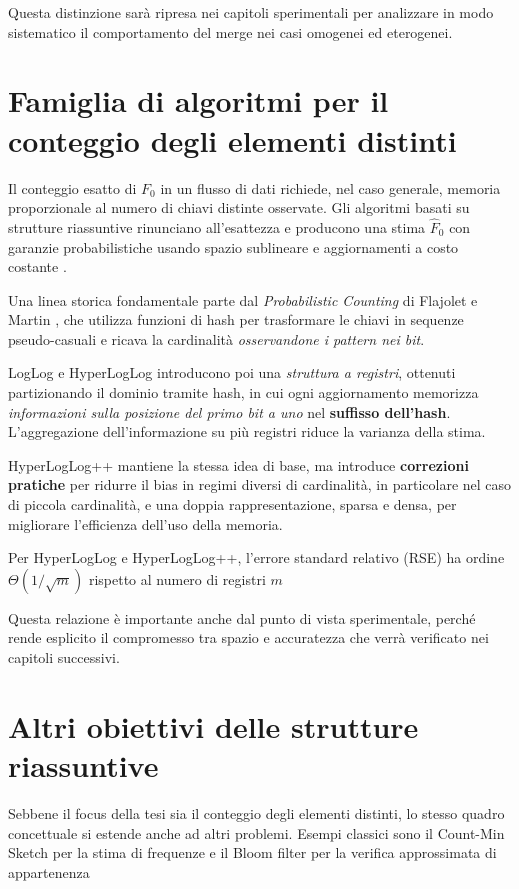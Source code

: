 Questa distinzione sarà ripresa nei capitoli sperimentali per analizzare in modo sistematico
il comportamento del merge nei casi omogenei ed eterogenei.

\section{Famiglia di algoritmi per il conteggio degli elementi distinti}
Il conteggio esatto di $F_0$ in un flusso di dati richiede, nel caso generale, memoria proporzionale
al numero di chiavi distinte osservate. Gli algoritmi basati su strutture riassuntive rinunciano all'esattezza
e producono una stima $\hat{F}_0$ con garanzie probabilistiche usando spazio sublineare
e aggiornamenti a costo costante \cite{BarYossef_Jayram_Kumar_Sivakumar_Trevisan_2002}.

Una linea storica fondamentale parte dal \emph{Probabilistic Counting} di Flajolet e Martin
\cite{Flajolet_Martin_1985}, che utilizza funzioni di hash per trasformare le chiavi
in sequenze pseudo-casuali e ricava la cardinalità \textit{osservandone i pattern nei bit}.

LogLog \cite{Durand_Flajolet_2003} e HyperLogLog \cite{Flajolet_Fusy_Gandouet_Meunier_2007}
introducono poi una \textit{struttura a registri}, ottenuti partizionando il dominio tramite hash,
in cui ogni aggiornamento memorizza \textit{informazioni sulla posizione del primo bit a uno} nel \textbf{suffisso dell'hash}.
L'aggregazione dell'informazione su più registri riduce la varianza della stima.

HyperLogLog++ \cite{Heule_Nunkesser_Hall_2013} mantiene la stessa idea di base,
ma introduce \textbf{correzioni pratiche} per ridurre il bias in regimi diversi di cardinalità,
in particolare nel caso di piccola cardinalità, e una doppia rappresentazione,
sparsa e densa, per migliorare l'efficienza dell'uso della memoria.

Per HyperLogLog e HyperLogLog++, l'errore standard relativo (RSE) ha ordine $\Theta(1/\sqrt{m})$
rispetto al numero di registri $m$ \cite{Flajolet_Fusy_Gandouet_Meunier_2007}

Questa relazione è importante anche dal punto di vista sperimentale, perché rende esplicito
il compromesso tra spazio e accuratezza che verrà verificato nei capitoli successivi.

\section{Altri obiettivi delle strutture riassuntive}
Sebbene il focus della tesi sia il conteggio degli elementi distinti, lo stesso quadro concettuale
si estende anche ad altri problemi. Esempi classici sono il Count-Min Sketch per la stima di frequenze
e il Bloom filter per la verifica approssimata di appartenenza
\cite{Cormode_CountMinSketch_Encyclopedia,Bloom_1970,Agarwal_Trachtenberg_2006}

